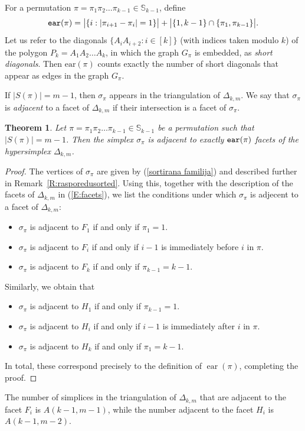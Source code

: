 \documentclass{birkjour}
\newtheorem{thm}{Theorem}[section]
\theoremstyle{definition}
\theoremstyle{remark}
\numberwithin{equation}{section}
\begin{document}
For a permutation $\pi=\pi_1\pi_2\ldots\pi_{k-1}\in
\mathbb{S}_{k-1}$, define
$$\verb"ear"(\pi)=\big|\{i:|\pi_{i+1}-\pi_i|=1\}
\big|+\big|\{1,k-1\}\cap\{\pi_1,\pi_{k-1}\}\big|.$$ Let us refer
to the diagonals $\{A_iA_{i+2} : i \in [k]\}$ (with indices taken
modulo $k$) of the polygon $P_k = A_1A_2\ldots A_k$, in which the
graph $G_\pi$ is embedded, as \emph{short diagonals}. Then
$\mathrm{ear}(\pi)$ counts exactly the number of short diagonals
that appear as edges in the graph $G_\pi$.

 If $|S(\pi)|=m-1$, then $\sigma_\pi$ appears in the
triangulation of $\Delta_{k,m}$. We say that $\sigma_\pi$ is
\emph{adjacent }to a facet of $\Delta_{k,m}$ if their intersection
is a facet of $\sigma_\pi$.



\begin{thm} Let
$\pi=\pi_1\pi_2\ldots\pi_{k-1}\in \mathbb{S}_{k-1}$ be a
permutation such that $|S(\pi)|=m-1$. Then the simplex
$\sigma_\pi$ is adjacent to exactly $\verb"ear"(\pi)$ facets of
the hypersimplex $\Delta_{k,m}$.
\end{thm}
\begin{proof}
The vertices of $\sigma_\pi$ are given by (\ref{sortirana
familija}) and described further in
Remark~\ref{R:rasporedusorted}. Using this, together with the
description of the facets of $\Delta_{k,m}$ in (\ref{E:facets}),
we list the conditions under which $\sigma_\pi$ is adjecent to a
facet of $\Delta_{k,m}$:
\begin{itemize}
    \item $\sigma_{\pi}$ is adjacent to $F_1$ if and only if
    $\pi_1=1$.
    \item $\sigma_{\pi}$ is adjacent to $F_i$ if and only if
    $i-1$ is immediately before $i$ in $\pi$.
    \item $\sigma_{\pi}$ is adjacent to $F_k$ if and only if
    $\pi_{k-1}=k-1$.
\end{itemize}
Similarly, we obtain that
\begin{itemize}
    \item $\sigma_{\pi}$ is adjacent to $H_1$ if and only if
    $\pi_{k-1}=1$.
    \item $\sigma_{\pi}$ is adjacent to $H_i$ if and only if
    $i-1$ is immediately after $i$ in $\pi$.
    \item $\sigma_{\pi}$ is adjacent to $H_k$ if and only if
    $\pi_{1}=k-1$.
\end{itemize}
In total, these correspond precisely to the definition of
$\operatorname{ear}(\pi)$, completing the proof.
\end{proof}
The number of simplices in the triangulation of $\Delta_{k,m}$
that are adjacent to the facet $F_i$ is $A(k-1,m-1)$, while the
number adjacent to the facet $H_i$ is $A(k-1,m-2)$.
\end{document}
